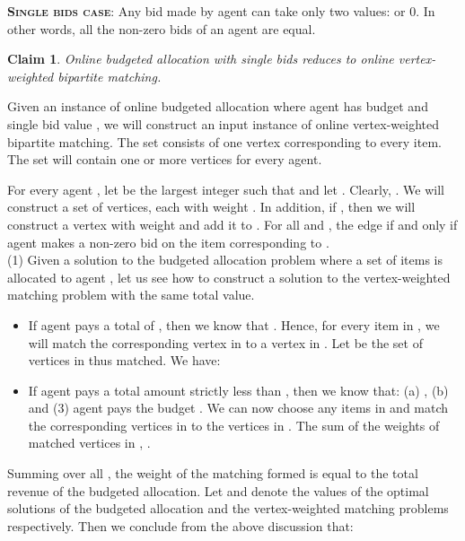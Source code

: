 \documentclass[11pt]{article}
\newtheorem{claim}{Claim}
\newcommand{\qed}{}
\newenvironment{proof}{\noindent{\em Proof:}}{\hfill \qed \medskip}
\begin{document}
\noindent \textbf{\textsc{Single bids case}}: Any bid made by agent  can take only two values:  or 0. In other words, all the non-zero bids of an agent are equal.

\begin{claim}
Online budgeted allocation with single bids reduces to online vertex-weighted bipartite matching.
\end{claim}
\begin{proof}
Given an instance of online budgeted allocation where agent  has budget  and single bid value , we will construct an input instance  of online vertex-weighted bipartite matching. The set  consists of one vertex corresponding to every item. The set  will contain one or more vertices for every agent.


For every agent , let  be the largest integer such that  and let . Clearly, . We will construct a set  of  vertices, each with weight . In addition, if , then we will construct a vertex  with weight  and add it to . For all  and , the edge  if and only if agent  makes a non-zero bid on the item corresponding to .\\

\noindent (1) Given a solution to the budgeted allocation problem where a set  of items is allocated to agent , let us see how to construct a solution to the vertex-weighted matching problem with the same total value. 
\begin{itemize}
\item If agent  pays a total of , then we know that . Hence, for every item in , we will match the corresponding vertex in  to a vertex in . Let  be the set of vertices in  thus matched. We have: 

\item If agent  pays a total amount strictly less than , then we know that: (a) , (b)  and (3) agent  pays the budget . We can now choose any  items in  and match the corresponding vertices in  to the  vertices in . The sum of the weights of matched vertices in , .
\end{itemize}
Summing over all , the weight of the matching formed is equal to the total revenue of the budgeted allocation. Let  and  denote the values of the optimal solutions of the budgeted allocation and the vertex-weighted matching problems respectively. Then we conclude from the above discussion that: 



\end{proof}
\end{document}
